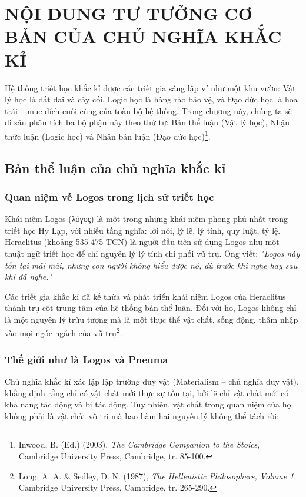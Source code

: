 \section{NỘI DUNG TƯ TƯỞNG CƠ BẢN CỦA CHỦ NGHĨA KHẮC KỈ}

Hệ thống triết học khắc kỉ được các triết gia sáng lập ví như một khu vườn: Vật lý học là đất đai và cây cối, Logic học là hàng rào bảo vệ, và Đạo đức học là hoa trái – mục đích cuối cùng của toàn bộ hệ thống. Trong chương này, chúng ta sẽ đi sâu phân tích ba bộ phận này theo thứ tự: Bản thể luận (Vật lý học), Nhận thức luận (Logic học) và Nhân bản luận (Đạo đức học)\footnote{Inwood, B. (Ed.) (2003), \textit{The Cambridge Companion to the Stoics}, Cambridge University Press, Cambridge, tr. 85-100.}.

\subsection{Bản thể luận của chủ nghĩa khắc kỉ}

\subsubsection{Quan niệm về Logos trong lịch sử triết học}

Khái niệm Logos (λόγος) là một trong những khái niệm phong phú nhất trong triết học Hy Lạp, với nhiều tầng nghĩa: lời nói, lý lẽ, lý tính, quy luật, tỷ lệ. Heraclitus (khoảng 535-475 TCN) là người đầu tiên sử dụng Logos như một thuật ngữ triết học để chỉ nguyên lý lý tính chi phối vũ trụ. Ông viết: \textit{"Logos này tồn tại mãi mãi, nhưng con người không hiểu được nó, dù trước khi nghe hay sau khi đã nghe."}

Các triết gia khắc kỉ đã kế thừa và phát triển khái niệm Logos của Heraclitus thành trụ cột trung tâm của hệ thống bản thể luận. Đối với họ, Logos không chỉ là một nguyên lý trừu tượng mà là một thực thể vật chất, sống động, thâm nhập vào mọi ngóc ngách của vũ trụ\footnote{Long, A. A. \& Sedley, D. N. (1987), \textit{The Hellenistic Philosophers, Volume 1}, Cambridge University Press, Cambridge, tr. 265-290.}.

\subsubsection{Thế giới như là Logos và Pneuma}

Chủ nghĩa khắc kỉ xác lập lập trường duy vật (Materialism – chủ nghĩa duy vật), khẳng định rằng chỉ có vật chất mới thực sự tồn tại, bởi lẽ chỉ vật chất mới có khả năng tác động và bị tác động. Tuy nhiên, vật chất trong quan niệm của họ không phải là vật chất vô tri mà bao hàm hai nguyên lý không thể tách rời:


